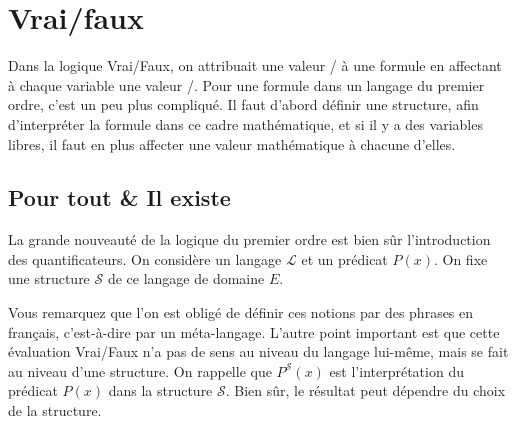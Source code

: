 \documentclass[11pt,class=report,crop=false]{standalone}
\begin{document}






\section{Vrai/faux}

Dans la logique Vrai/Faux, on attribuait une valeur \ltrue/\lfalse{} à une formule en affectant à chaque variable une valeur \ltrue/\lfalse. Pour une formule dans un langage du premier ordre, c'est un peu plus compliqué. Il faut d'abord définir une structure, afin d'interpréter la formule dans ce cadre mathématique, et si il y a des variables libres, il faut en plus affecter une valeur mathématique à chacune d'elles.

 
\subsection{Pour tout \& Il existe}


La grande nouveauté de la logique du premier ordre est bien sûr l'introduction des quantificateurs.
On considère un langage $\mathcal{L}$ et un prédicat $P(x)$.
On fixe une structure $\mathcal{S}$ de ce langage de domaine $E$.




Vous remarquez que l'on est obligé de définir ces notions par des phrases en français, c'est-à-dire par un méta-langage.
L'autre point important est que cette évaluation Vrai/Faux n'a pas de sens au niveau du langage lui-même, mais se fait au niveau d'une structure. 
On rappelle que $P^{\mathcal{S}}(x)$ est l'interprétation du prédicat $P(x)$ dans la structure $\mathcal{S}$.
Bien sûr, le résultat peut dépendre du choix de la structure.
\end{document}
